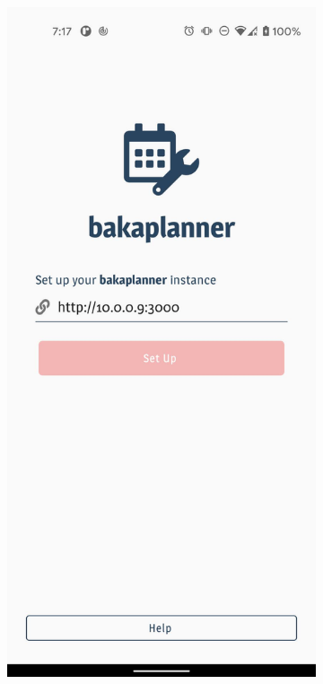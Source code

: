 \documentclass[twoside]{ctuthesis}
\begin{document}
\begin{figure}[h]
	\centering
	\begin{subfigure}{.5\textwidth}
		\centering
		\includegraphics[width=.9\linewidth]{img/uc1_screen001.jpg}
		\label{fig:uc1-url}
	\end{subfigure}%

\end{figure}
\end{document}
